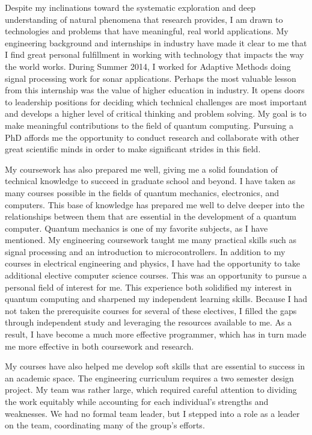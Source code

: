 {    Despite my inclinations toward the systematic exploration and deep
    understanding of natural phenomena that research provides, I am drawn to
    technologies and problems that have meaningful, real world applications. My
    engineering background and internships in industry have made it clear to me
    that I find great personal fulfillment in working with technology that
    impacts the way the world works. During Summer 2014, I worked for Adaptive
    Methods doing signal processing work for sonar applications. Perhaps the
    most valuable lesson from this internship was the value of higher education
    in industry. It opens doors to leadership positions for deciding which
    technical challenges are most important and develops a higher level of
    critical thinking and problem solving. My goal is to make meaningful
    contributions to the field of quantum computing. Pursuing a PhD affords me
    the opportunity to conduct research and collaborate with other great
    scientific minds in order to make significant strides in this field.

    My coursework has also prepared me well, giving me a solid foundation of
    technical knowledge to succeed in graduate school and beyond. I have
    taken as many courses possible in the fields of quantum mechanics,
    electronics, and computers.  This base of knowledge has prepared me well to
    delve deeper into the relationships between them that are essential in the
    development of a quantum computer.  Quantum mechanics is one of my favorite
    subjects, as I have mentioned. My engineering coursework taught me many
    practical skills such as signal processing and an introduction to
    microcontrollers.  In addition to my courses in electrical engineering and
    physics, I have had the opportunity to take additional elective computer
    science courses. This was an opportunity to pursue a personal field of
    interest for me.  This experience both solidified my interest in quantum
    computing and sharpened my independent learning skills. Because I had not
    taken the prerequisite courses for several of these electives, I filled the
    gaps through independent study and leveraging the resources available to
    me. As a result, I have become a much more effective programmer, which has
    in turn made me more effective in both coursework and research.

    My courses have also helped me develop soft skills that are essential to
    success in an academic space. The engineering curriculum requires a two
    semester design project.  My team was rather large, which required careful
    attention to dividing the work equitably while accounting for each
    individual's strengths and weaknesses.  We had no formal team leader, but I
    stepped into a role as a leader on the team, coordinating many of the
    group's efforts.

}
